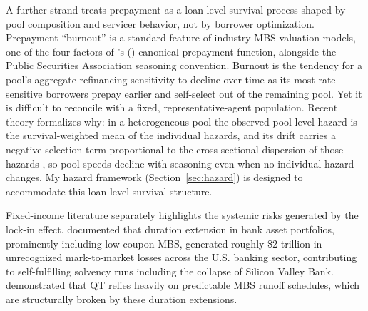 \documentclass[12pt]{article}
\newcommand{\citepos}[1]{\citeauthor{#1}'s (\citeyear{#1})}
\begin{document}
A further strand treats prepayment as a loan-level survival process shaped by pool composition and servicer behavior, not by borrower optimization. Prepayment ``burnout'' is a standard feature of industry MBS valuation models, one of the four factors of \citepos{richard1989} canonical prepayment function, alongside the Public Securities Association seasoning convention. Burnout is the tendency for a pool's aggregate refinancing sensitivity to decline over time as its most rate-sensitive borrowers prepay earlier and self-select out of the remaining pool. Yet it is difficult to reconcile with a fixed, representative-agent population. Recent theory formalizes why: in a heterogeneous pool the observed pool-level hazard is the survival-weighted mean of the individual hazards, and its drift carries a negative selection term proportional to the cross-sectional dispersion of those hazards \citep[arXiv preprint]{lesniewski2026}, so pool speeds decline with seasoning even when no individual hazard changes. My hazard framework (Section~\ref{sec:hazard}) is designed to accommodate this loan-level survival structure.

Fixed-income literature separately highlights the systemic risks generated by the lock-in effect. \citet{jiang2023} documented that duration extension in bank asset portfolios, prominently including low-coupon MBS, generated roughly \$2 trillion in unrecognized mark-to-market losses across the U.S. banking sector, contributing to self-fulfilling solvency runs including the collapse of Silicon Valley Bank. \citet{smith2023} demonstrated that QT relies heavily on predictable MBS runoff schedules, which are structurally broken by these duration extensions.
\end{document}

